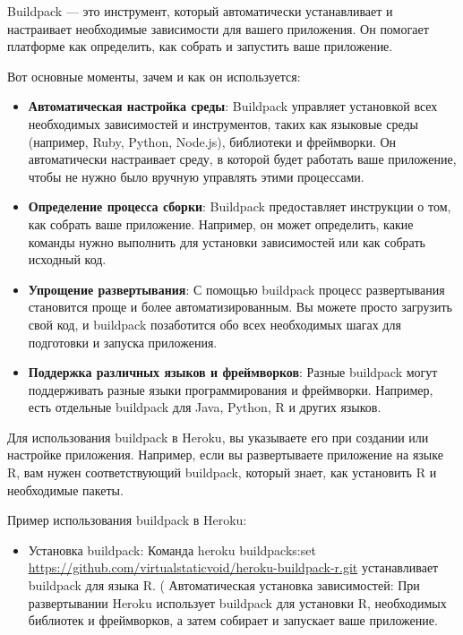 \documentclass[
]{book}
\providecommand{\tightlist}{%
  \setlength{\itemsep}{0pt}\setlength{\parskip}{0pt}}
\begin{document}
Buildpack --- это инструмент, который автоматически устанавливает и настраивает необходимые зависимости для вашего приложения. Он помогает платформе как определить, как собрать и запустить ваше приложение.

Вот основные моменты, зачем и как он используется:

\begin{itemize}
\tightlist
\item
  \textbf{Автоматическая настройка среды}: Buildpack управляет установкой всех необходимых зависимостей и инструментов, таких как языковые среды (например, Ruby, Python, Node.js), библиотеки и фреймворки. Он автоматически настраивает среду, в которой будет работать ваше приложение, чтобы не нужно было вручную управлять этими процессами.
\item
  \textbf{Определение процесса сборки}: Buildpack предоставляет инструкции о том, как собрать ваше приложение. Например, он может определить, какие команды нужно выполнить для установки зависимостей или как собрать исходный код.
\item
  \textbf{Упрощение развертывания}: С помощью buildpack процесс развертывания становится проще и более автоматизированным. Вы можете просто загрузить свой код, и buildpack позаботится обо всех необходимых шагах для подготовки и запуска приложения.
\item
  \textbf{Поддержка различных языков и фреймворков}: Разные buildpack могут поддерживать разные языки программирования и фреймворки. Например, есть отдельные buildpack для Java, Python, R и других языков.
\end{itemize}

Для использования buildpack в Heroku, вы указываете его при создании или настройке приложения. Например, если вы развертываете приложение на языке R, вам нужен соответствующий buildpack, который знает, как установить R и необходимые пакеты.

Пример использования buildpack в Heroku:

\begin{itemize}
\tightlist
\item
  Установка buildpack: Команда heroku buildpacks:set \url{https://github.com/virtualstaticvoid/heroku-buildpack-r.git} устанавливает buildpack для языка R.
  ( Автоматическая установка зависимостей: При развертывании Heroku использует buildpack для установки R, необходимых библиотек и фреймворков, а затем собирает и запускает ваше приложение.
\end{itemize}
\end{document}
